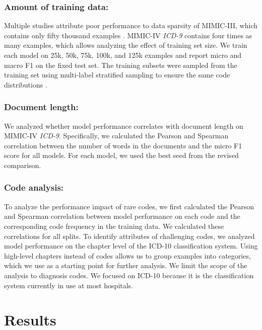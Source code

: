 \documentclass[anonymous=false, sigconf=true, review=false, natbib=true]{acmart}
\begin{document}
\subsubsection{Amount of training data:}
Multiple studies attribute poor performance to data sparsity of MIMIC-III, which contains only fifty thousand examples \cite{kavuluruEmpiricalEvaluationSupervised2015,tengExplainablePredictionMedical2020,yanMedicalCodingClassification2010,yangKnowledgeInjectedPrompt2022}. MIMIC-IV \textit{ICD-9} contains four times as many examples, which allows analyzing the effect of training set size. We train each model on 25k, 50k, 75k, 100k, and 125k examples and report micro and macro F1 on the fixed test set. The training subsets were sampled from the training set using multi-label stratified sampling to ensure the same code distributions \cite{sechidisStratificationMultilabelData2011}.



\subsubsection{Document length:}
We analyzed whether model performance correlates with document length on MIMIC-IV \textit{ICD-9}. Specifically, we calculated the Pearson and Spearman correlation between the number of words in the documents and the micro F1 score for all models. For each model, we used the best seed from the revised comparison.

\subsubsection{Code analysis:}
To analyze the performance impact of rare codes, we first calculated the Pearson and Spearman correlation between model performance on each code and the corresponding code frequency in the training data. We calculated these correlations for all splits. To identify attributes of challenging codes, we analyzed model performance on the chapter level of the ICD-10 classification system. Using high-level chapters instead of codes allows us to group examples into categories, which we use as a starting point for further analysis. We limit the scope of the analysis to diagnosis codes. We focused on ICD-10 because it is the classification system currently in use at most hospitals. 


\section{Results}
\end{document}
